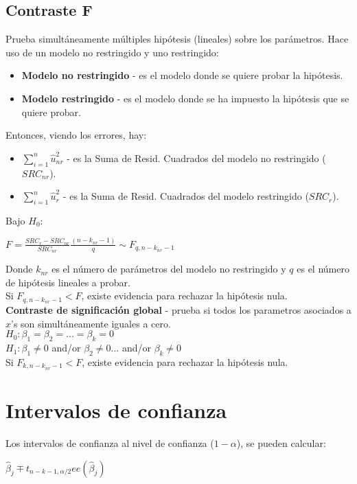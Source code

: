 \documentclass[10pt, a4paper, landscape]{extarticle}
\begin{document}
\begin{multicols}{3}
	\subsection*{Contraste F}
		Prueba simultáneamente múltiples hipótesis (lineales) sobre los parámetros. Hace uso de un modelo no restringido y uno restringido:
		\begin{itemize}[leftmargin=*]
			\item \textbf{Modelo no restringido} - es el modelo donde se quiere probar la hipótesis.
			\item \textbf{Modelo restringido} - es el modelo donde se ha impuesto la hipótesis que se quiere probar.
		\end{itemize}
		Entonces, viendo los errores, hay:
		\begin{itemize}[leftmargin=*]
			\item \textbf{$\sum_{i=1}^n \hat{u}_{nr}^2$} - es la Suma de Resid. Cuadrados del modelo no restringido ($SRC_{nr}$).
			\item \textbf{$\sum_{i=1}^n \hat{u}_r^2$} - es la Suma de Resid. Cuadrados del modelo restringido ($SRC_r$).
		\end{itemize}
		Bajo $H_0$:
		\begin{center}
			$F = \frac{SRC_r - SRC_{nr}}{SRC_{nr}} \frac{(n-k_{nr}-1)}{q} \sim F_{q, n-k_{nr}-1}$
		\end{center}
		Donde $k_{nr}$ es el número de parámetros del modelo no restringido y $q$ es el número de hipótesis lineales a probar.
		\\ Si $F_{q, n-k_{nr}-1} < F$, existe evidencia para rechazar la hipótesis nula.
		\\ \textbf{Contraste de significación global} - prueba si todos los parametros asociados a $x$'s son simultáneamente iguales a cero.
		\\ $H_0: \beta_1 = \beta_2 = ... = \beta_k = 0$
		\\ $H_1: \beta_1 \neq 0$ and/or $\beta_2 \neq 0 ...$ and/or $\beta_k \neq 0$
		\\ Si $F_{k, n-k_{nr}-1} < F$, existe evidencia para rechazar la hipótesis nula.

\section*{Intervalos de confianza}
	Los intervalos de confianza al nivel de confianza ($1 - \alpha$), se pueden calcular:
	\begin{center}
		$\hat{\beta}_j \mp t_{n-k-1, \alpha/2} ee(\hat{\beta}_j)$
	\end{center}


\end{multicols}
\end{document}
